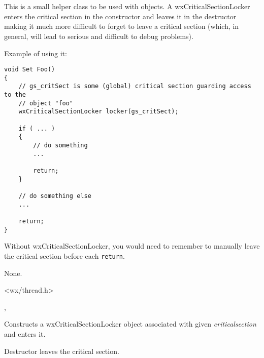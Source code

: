 \section{}\label{wxcriticalsectionlocker}

This is a small helper class to be used with  
objects. A wxCriticalSectionLocker enters the critical section in the
constructor and leaves it in the destructor making it much more difficult to
forget to leave a critical section (which, in general, will lead to serious
and difficult to debug problems).

Example of using it:

\begin{verbatim}
void Set Foo()
{
    // gs_critSect is some (global) critical section guarding access to the
    // object "foo"
    wxCriticalSectionLocker locker(gs_critSect);

    if ( ... )
    {
        // do something
        ...

        return;
    }

    // do something else
    ...

    return;
}
\end{verbatim}

Without wxCriticalSectionLocker, you would need to remember to manually leave
the critical section before each {\tt return}.


None.


<wx/thread.h>


, 


\label{wxcriticalsectionlockerctor}


Constructs a wxCriticalSectionLocker object associated with given
{\it criticalsection} and enters it.

\label{wxcriticalsectionlockerdtor}


Destructor leaves the critical section.

